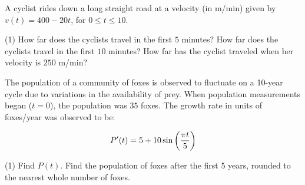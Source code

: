 \documentclass[../mathNotesPreamble]{subfiles}
\begin{document}
  \begin{center}
  \end{center}
  \pagebreak

  \begin{ex*}
    A cyclist rides down a long straight road at a velocity (in m/min) given by $v(t)= 400-20t$, for $0\leq t\leq 10$.
  \end{ex*}
  \begin{tasks}[after-item-skip=\stretch{1}, label=\textbullet](1)
    \task 
      How far does the cyclists travel in the first $5$ minutes?
    \task 
      How far does the cyclists travel in the first $10$ minutes?
    \task 
      How far has the cyclist traveled when her velocity is $250$ m/min?
  \end{tasks}
  \pagebreak

  \begin{ex*}
    The population of a community of foxes is observed to fluctuate on a 10-year cycle due to variations in the availability of prey.  When population measurements began ($t=0$), the population was $35$ foxes.  The growth rate in units of foxes/year was observed to be: 
  \end{ex*}
    \[P'(t)=5+10\sin{\left(\frac{\pi t}{5}\right)}\]
  \begin{tasks}[after-item-skip=\stretch{1}, label=\textbullet](1)
    \task 
      Find $P(t)$.
    \task 
      Find the population of foxes after the first 5 years, rounded to the nearest whole number of foxes.
  \end{tasks}
  \pagebreak
\end{document}
